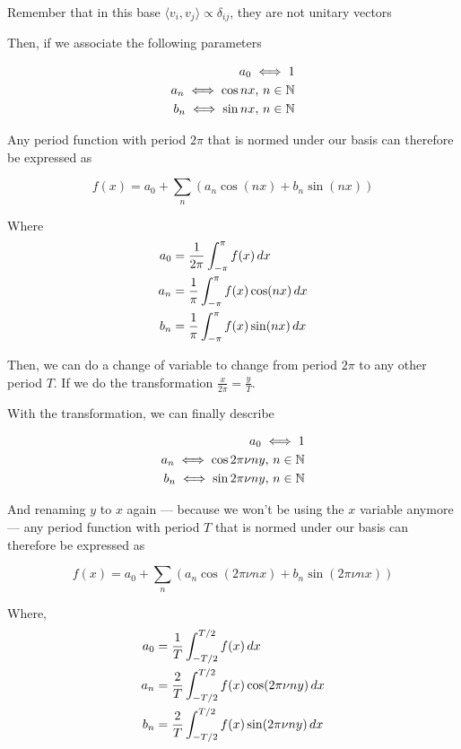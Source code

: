\documentclass[../main/main.tex]{subfiles}
\begin{document}
	
	Remember that in this base $\langle v_{i},v_{j}\!\rangle \propto \delta_{ij}$, they are not unitary vectors
	
	Then, if we associate the following parameters 
	
	\begin{align*}
	a_{0} \iff {1}\\
	a_{n} \iff {\cos nx},\, n \in \mathbb{N}\\
	b_{n} \iff {\sin nx} ,\,n \in \mathbb{N}\\
	\end{align*}
	
	Any period function with period $2\pi$ that is normed under our basis can therefore be expressed as 
	
	\begin{equation}
	f(x) = a_{0} + \sum_{n}\left(a_{n} \cos (nx) + b_{n} \sin(nx)\right)
	\end{equation}
	
	
	Where
	\begin{align}
	a_{0} &= \frac{1}{2\pi} \fourierint{f(x)} \\
	a_{n} &= \frac{1}{\pi} \fourierint{f(x) \cos(nx)} \\
	b_{n} &= \frac{1}{\pi} \fourierint{f(x) \sin(nx)} 
	\end{align}
	
	Then, we can do a change of variable to change from period $2\pi$ to any other period $T$. If we do the transformation $\frac{x}{2\pi} = \frac{y}{T}$.
	
	With the transformation, we can finally describe
	
		
	\begin{align*}
	a_{0} \iff {1}\\
	a_{n} \iff {\cos 2\pi \nu n y},\, n \in \mathbb{N}\\
	b_{n} \iff {\sin 2\pi \nu n y} ,\,n \in \mathbb{N}\\
	\end{align*}
	
	And renaming $y$ to $x$ again --- because we won't be using the $x$ variable anymore --- any period function with period $T$ that is normed under our basis can therefore be expressed as 
	
	\begin{equation}
	f(x) = a_{0} + \sum_{n}\left(a_{n} \cos ( 2\pi \nu n x) + b_{n} \sin( 2\pi \nu n x)\right)
	\end{equation}
	
	
	Where, 
	\begin{align}
	a_{0} &= \frac{1}{T} \fourier[-T/2][T/2]{f(x)} \\
	a_{n} &= \frac{2}{T} \fourier[-T/2][T/2]{f(x) \cos(2\pi \nu n y)} \\
	b_{n} &= \frac{2}{T} \fourier[-T/2][T/2]{f(x) \sin(2\pi \nu n y)} 
	\end{align}
\end{document}
